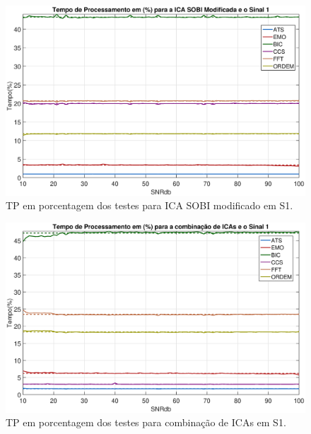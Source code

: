 \documentclass[a4paper,12pt]{monografia}
\theoremstyle{plain}
\theoremstyle{definition}
\theoremstyle{remark}
\begin{document}
\begin{figure}[!htb]
    \begin{center}
    \advance\leftskip -1.5cm
    \includegraphics[scale=0.45]{imagens/ImagensParaOAnexo/TPPRICASOBImodSinal1.eps}
    \caption{TP em porcentagem dos testes para ICA SOBI modificado em S1.}
    \label{fig:TPSMRS1}    
    \end{center}
\end{figure}

\begin{figure}[!htb]
    \begin{center}
    \advance\leftskip -1.5cm
    \includegraphics[scale=0.45]{imagens/ImagensParaOAnexo/TPPRCombinacaoICASinal1.eps}
    \caption{TP em porcentagem dos testes para combinação de ICAs em S1.}
    \label{fig:TPCIRS1}    
    \end{center}
\end{figure}
\end{document}
